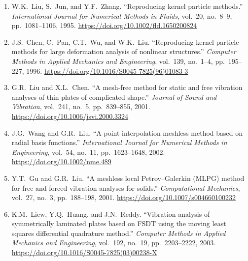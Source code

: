 \documentclass[a4paper,10pt]{article}
\begin{document}
\begin{enumerate}
    \item \label{liu1995}
    W.K.~Liu, S.~Jun, and Y.F.~Zhang.
    ``Reproducing kernel particle methods.''
    \emph{International Journal for Numerical Methods in Fluids},
    vol.~20, no.~8--9, pp.~1081--1106, 1995.
    \newline \url{https://doi.org/10.1002/fld.1650200824}

    \item \label{chen1996}
    J.S.~Chen, C.~Pan, C.T.~Wu, and W.K.~Liu.
    ``Reproducing kernel particle methods for large deformation analysis of 
    nonlinear structures.''
    \emph{Computer Methods in Applied Mechanics and Engineering},
    vol.~139, no.~1--4, pp.~195--227, 1996.
    \newline \url{https://doi.org/10.1016/S0045-7825(96)01083-3}

    \item \label{liu2001}
    G.R.~Liu and X.L.~Chen.
    ``A mesh-free method for static and free vibration analyses of thin plates 
    of complicated shape.''
    \emph{Journal of Sound and Vibration}, vol.~241, no.~5, pp.~839--855, 2001.
    \newline \url{https://doi.org/10.1006/jsvi.2000.3324}

    \item \label{wang2002}
    J.G.~Wang and G.R.~Liu.
    ``A point interpolation meshless method based on radial basis functions.''
    \emph{International Journal for Numerical Methods in Engineering},
    vol.~54, no.~11, pp.~1623--1648, 2002.
    \newline \url{https://doi.org/10.1002/nme.489}

    \item \label{gu2001}
    Y.T.~Gu and G.R.~Liu.
    ``A meshless local Petrov--Galerkin (MLPG) method for free and 
    forced vibration analyses for solids.''
    \emph{Computational Mechanics}, vol.~27, no.~3, pp.~188--198, 2001.
    \newline \url{https://doi.org/10.1007/s004660100232}

    \item \label{liew2003}
    K.M.~Liew, Y.Q.~Huang, and J.N.~Reddy.
    ``Vibration analysis of symmetrically laminated plates based on FSDT using 
    the moving least squares differential quadrature method.''
    \emph{Computer Methods in Applied Mechanics and Engineering},
    vol.~192, no.~19, pp.~2203--2222, 2003.
    \newline \url{https://doi.org/10.1016/S0045-7825(03)00238-X}


\end{enumerate}
\end{document}
